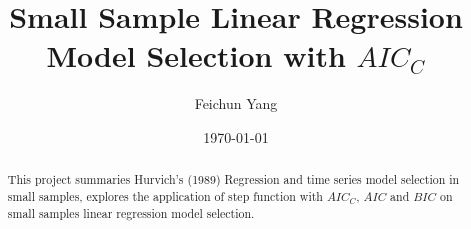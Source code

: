 \documentclass[a4paper]{article}
\title{Small Sample Linear Regression Model Selection with $AIC_C$}
\author{Feichun Yang}
\date{\today}
\theoremstyle{plain}
\begin{document}
\maketitle

\begin{abstract}
This project summaries Hurvich's (1989) Regression and time series model selection in small samples, explores the application of step function with $AIC_C$, $AIC$ and $BIC$ on small samples linear regression model selection.
\end{abstract}







\end{document}

